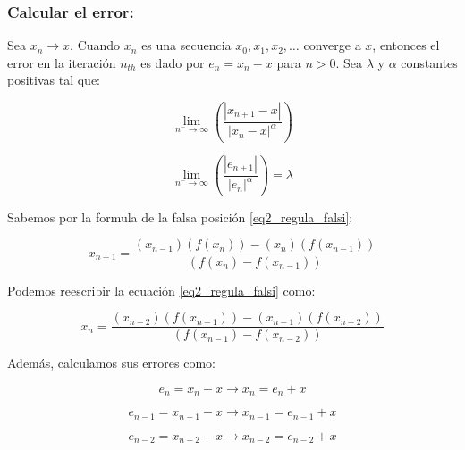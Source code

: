 
\subsubsection{Calcular el error:}

Sea $ {x_n} \rightarrow x $. Cuando $ x_n $ es una secuencia $ {x_0,x_1,x_2,\ldots} $ converge a $ x $, entonces el error en la iteración $ n_{th} $ es dado por $ e_n = x_n - x $ para $ n > 0 $.\newline\newline
Sea $ \lambda $ y $ \alpha $ constantes positivas tal que:

\begin{displaymath}
    \lim_{n^{-} \to \infty} (\frac{|x_{n+1} - x|}{|x_n - x|^\alpha})
\end{displaymath}

\begin{displaymath}
    \lim_{n^{-} \to \infty} (\frac{|e_{n+1}|}{|e_n|^\alpha}) = \lambda
\end{displaymath}

Sabemos por la formula de la falsa posición \eqref{eq2_regula_falsi}:

\begin{displaymath}
    x_{n+1} = \frac{(x_{n-1})(f(x_n)) - (x_n)(f(x_{n-1}))}{(f(x_n) - f(x_{n-1}))}
\end{displaymath}

Podemos reescribir la ecuación \eqref{eq2_regula_falsi} como:

\begin{equation}
    \label{eq3_regula_falsi}
    x_n = \frac{(x_{n-2})(f(x_{n-1})) - (x_{n-1})(f(x_{n-2}))}{(f(x_{n-1}) - f(x_{n-2}))}
\end{equation}

Además, calculamos sus errores como:

\begin{equation}
    \label{eq4_regula_falsi}
    e_n = x_n - x \rightarrow x_n = e_n + x
\end{equation}

\begin{equation}
    \label{eq5_regula_falsi}
    e_{n-1} = x_{n-1} - x \rightarrow x_{n-1} = e_{n-1} + x
\end{equation}

\begin{equation}
    \label{eq6_regula_falsi}
    e_{n-2} = x_{n-2} - x \rightarrow x_{n-2} = e_{n-2} + x
\end{equation}

